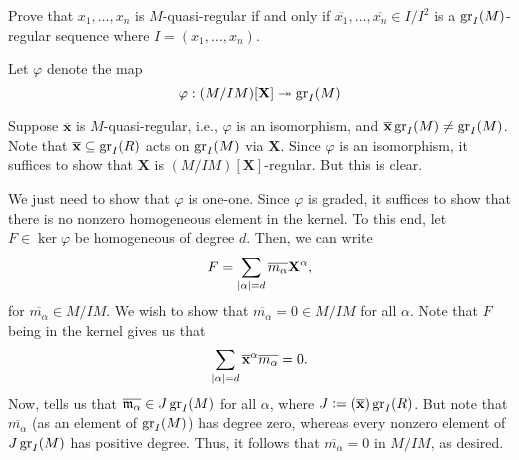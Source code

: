 \documentclass[12pt]{article}
\begin{document}
\begin{exe}
	Prove that $x_{1}, \ldots, x_{n}$ is $M$-quasi-regular if and only if $\overline{x_{1}}, \ldots, \overline{x_{n}} \in I/I^{2}$ is a $\operatorname{gr}_{I}(M)$-regular sequence where $I = (x_{1}, \ldots, x_{n})$.
\end{exe}
\begin{soln}
	Let $\varphi$ denote the map
	\begin{equation*} 
		\varphi : (M/IM)[\mathbf{X}] \twoheadrightarrow \operatorname{gr}_{I}(M)
	\end{equation*}

	\forward Suppose $\overline{\mathbf{x}}$ is $M$-quasi-regular, i.e., $\varphi$ is an isomorphism, and $\overline{\mathbf{x}} \operatorname{gr}_{I}(M) \neq \operatorname{gr}_{I}(M)$. Note that $\overline{\mathbf{x}} \subseteq \operatorname{gr}_{I}(R)$ acts on $\operatorname{gr}_{I}(M)$ via $\mathbf{X}$. Since $\varphi$ is an isomorphism, it suffices to show that $\mathbf{X}$ is $(M/IM)[\mathbf{X}]$-regular. But this is clear.

	\backward We just need to show that $\varphi$ is one-one. Since $\varphi$ is graded, it suffices to show that there is no nonzero homogeneous element in the kernel. To this end, let $F \in \ker \varphi$ be homogeneous of degree $d$. Then, we can write
	\begin{equation*} 
		F  = \sum_{{\left\lvert \alpha \right\lvert} = d} \overline{m_{\alpha}} \mathbf{X}^{\alpha},
	\end{equation*}
	for $\overline{m_{\alpha}} \in M/IM$. We wish to show that $\overline{m_{\alpha}} = 0 \in M/IM$ for all $\alpha$. Note that $F$ being in the kernel gives us that
	\begin{equation*} 
		\sum_{{\left\lvert \alpha \right\lvert} = d} \mathbf{\overline{x}}^{\alpha} \overline{m_{\alpha}}= 0.
	\end{equation*}
	Now,  tells us that $\overline{\mathfrak{m}_{\alpha}} \in J \operatorname{gr}_{I}(M)$ for all $\alpha$, where $J \vcentcolon= (\overline{\mathbf{x}}) \operatorname{gr}_{I}(R)$. But note that $\overline{m_{\alpha}}$ (as an element of $\operatorname{gr}_{I}(M)$) has degree zero, whereas every nonzero element of $J \operatorname{gr}_{I}(M)$ has positive degree. Thus, it follows that $\overline{m_{\alpha}} = 0$ in $M/IM$, as desired.
\end{soln}
\end{document}

